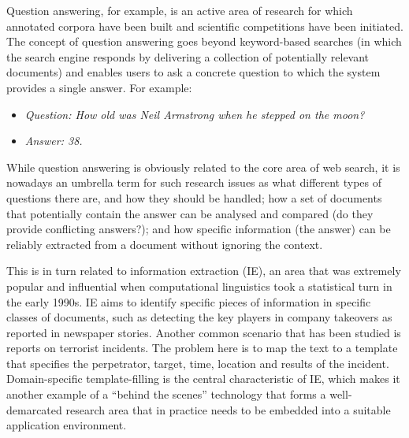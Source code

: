 \begin{multicols}{2}
Question answering, for example, is an active area of research for which annotated corpora have been built and scientific competitions have been initiated. The concept of question answering goes beyond keyword-based searches (in which the search engine responds by delivering a collection of potentially relevant documents) and enables users to ask a concrete question to which the system provides a single answer. For example:

\begin{itemize}
\item[] \textit{Question: How old was Neil Armstrong when he stepped on the moon?}
\item[] \textit{Answer: 38.}
\end{itemize}

While question answering is obviously related to the core area of web search, it is nowadays an umbrella term for such research issues as what different types of questions there are, and how they should be handled; how a set of documents that potentially contain the answer can be analysed and compared (do they provide conflicting answers?); and how specific information (the answer) can be reliably extracted from a document without ignoring the context. 

This is in turn related to information extraction (IE), an area that was extremely popular and influential when computational linguistics took a statistical turn in the early 1990s. IE aims to identify specific pieces of information in specific classes of documents, such as detecting the key players in company takeovers as reported in newspaper stories. Another common scenario that has been studied is reports on terrorist incidents. The problem here is to map the text to a template that specifies the perpetrator, target, time, location and results of the incident. Domain-specific template-filling is the central characteristic of IE, which makes it another example of a “behind the scenes” technology that forms a well-demarcated research area that in practice needs to be embedded into a suitable application environment. 


\end{multicols}
